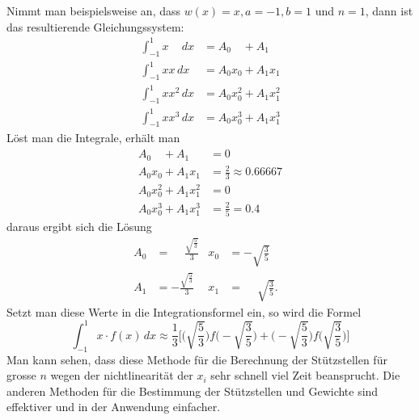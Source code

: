 Nimmt man beispielsweise an, dass $w(x) = x, a = -1, b = 1$ und $n = 1$, 
dann ist das resultierende Gleichungssystem:
\begin{align}
    \int_{-1}^{1} x \phantom{x^{0}} \, dx &= A_{0}\phantom{x^{0}} + A_{1}\phantom{x^{0}} \\
    \int_{-1}^{1} x x \, dx &= A_{0}x_{0} + A_{1}x_{1} \\
    \int_{-1}^{1} x x^{2} \, dx &= A_{0}x_{0}^{2} + A_{1}x_{1}^{2} \\
    \int_{-1}^{1} x x^{3} \, dx &= A_{0}x_{0}^{3} + A_{1}x_{1}^{3} 
\end{align}
Löst man die Integrale, erhält man
\begin{align}
    A_{0}\phantom{x^{0}} + A_{1}\phantom{x^{0}} &= 0 \\
    A_{0}x_{0} + A_{1}x_{1} &= \frac{2}{3} \approx 0.66667 \\
    A_{0}x_{0}^{2} + A_{1}x_{1}^{2} &= 0 \\
    A_{0}x_{0}^{3} + A_{1}x_{1}^{3} &= \frac{2}{5} = 0.4
\end{align}
daraus ergibt sich die Lösung
\begin{align}
    A_{0} &= \phantom{-}\frac{\sqrt{\frac{5}{3}}}{3} & x_{0} &= -\sqrt{\frac{3}{5}} & \\
    A_{1} &= -\frac{\sqrt{\frac{5}{3}}}{3} & x_{1} &= \phantom{-}\sqrt{\frac{3}{5}}. &
\end{align}
Setzt man diese Werte in die Integrationsformel ein, so wird die Formel
\begin{equation}
    \int_{-1}^{1}x \cdot f(x)\,dx 
    \approx 
    \frac{1}{3} 
    \bigg[ 
        \biggl(\sqrt{\frac{5}{3}}\biggr)
        f\biggl(-\sqrt{\frac{3}{5}}\biggr) 
        + 
        \biggl(-\sqrt{\frac{5}{3}}\biggr)
        f\biggl(\sqrt{\frac{3}{5}}\biggr)
    \bigg]
\end{equation}
Man kann sehen, dass diese Methode für die Berechnung der Stützstellen 
für grosse $n$ wegen der nichtlinearität der $x_{i}$ sehr schnell viel Zeit beansprucht.
Die anderen Methoden für die Bestimmung der Stützstellen 
und Gewichte sind effektiver und in der Anwendung einfacher.

